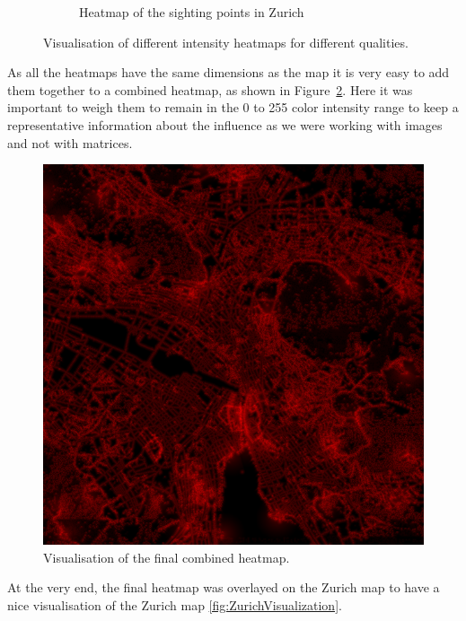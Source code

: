 \documentclass[letterpaper]{article}
\begin{document}
\begin{figure}[htb]
\begin{subfigure}[t]{.48\columnwidth}
        \caption[width=.9\linewidth]{Heatmap of the sighting points in Zurich}
    \end{subfigure}
    \caption{Visualisation of different intensity heatmaps for different qualities.}
    \label{fig:ZurichSingleHeatmaps}
\end{figure}


\indent As all the heatmaps have the same dimensions as the map it is very easy to add them together to a combined heatmap, 
as shown in Figure~\ref{fig:ZurichAllHeatmaps}. Here it was important to weigh them to remain in the 0 to 255 color intensity 
range to keep a representative information about the influence as we were working with images and not with matrices.

\begin{figure}
    \centering
    \includegraphics[width=.95\linewidth]{images/combined_heatmap.png}
    \caption{Visualisation of the final combined heatmap.}
    \label{fig:ZurichAllHeatmaps}
\end{figure}

\indent At the very end, the final heatmap was overlayed on the Zurich map to have a nice visualisation of the Zurich map 
\ref{fig:ZurichVisualization}.
\end{document}
